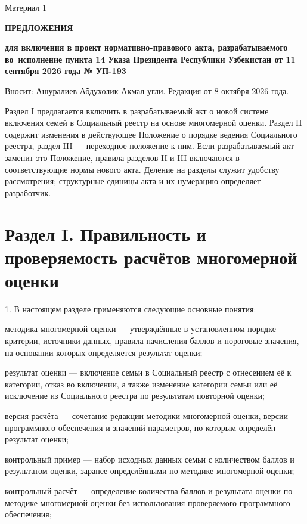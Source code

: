 \documentclass[14pt,a4paper]{extarticle}
\newcommand{\norm}[1]{\par\noindent\hspace*{1.27cm}#1. }
\begin{document}
\begin{flushright}Материал 1\end{flushright}
\begin{center}\textbf{ПРЕДЛОЖЕНИЯ}\par
\textbf{для включения в проект нормативно-правового акта, разрабатываемого во~исполнение пункта 14 Указа Президента Республики Узбекистан от 11 сентября 2026 года № УП-193}\end{center}

\noindent Вносит: Ашуралиев Абдухолик Акмал угли. Редакция от 8 октября 2026 года.

Раздел I предлагается включить в разрабатываемый акт о новой системе включения семей в Социальный реестр на основе многомерной оценки. Раздел II содержит изменения в действующее Положение о порядке ведения Социального реестра, раздел III — переходное положение к ним. Если разрабатываемый акт заменит это Положение, правила разделов II и III включаются в соответствующие нормы нового акта. Деление на разделы служит удобству рассмотрения; структурные единицы акта и их нумерацию определяет разработчик.

\section*{Раздел I. Правильность и проверяемость расчётов многомерной оценки}

\norm{1}В настоящем разделе применяются следующие основные понятия:

методика многомерной оценки — утверждённые в установленном порядке критерии, источники данных, правила начисления баллов и пороговые значения, на основании которых определяется результат оценки;

результат оценки — включение семьи в Социальный реестр с отнесением её к категории, отказ во включении, а также изменение категории семьи или её исключение из Социального реестра по результатам повторной оценки;

версия расчёта — сочетание редакции методики многомерной оценки, версии программного обеспечения и значений параметров, по которым определён результат оценки;

контрольный пример — набор исходных данных семьи с количеством баллов и результатом оценки, заранее определёнными по методике многомерной оценки;

контрольный расчёт — определение количества баллов и результата оценки по методике многомерной оценки без использования проверяемого программного обеспечения;
\end{document}

